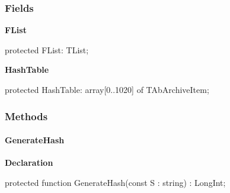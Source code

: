 \documentclass{report}
\newif\ifpdf
\begin{document}
\subsubsection*{\large{\textbf{Fields}}\normalsize\hspace{1ex}\hfill}
\begin{list}{}{
\setlength{\itemindent}{0cm}
\setlength{\listparindent}{0cm}
\setlength{\leftmargin}{\evensidemargin}
\addtolength{\leftmargin}{\tmplength}
\settowidth{\labelsep}{X}
\addtolength{\leftmargin}{\labelsep}
\setlength{\labelwidth}{\tmplength}
}
\label{AbArcTyp.TAbArchiveList-FList}
\item[\textbf{FList}\hfill]
\ifpdf
\begin{flushleft}
\fi
\begin{ttfamily}
protected FList: TList;\end{ttfamily}

\ifpdf
\end{flushleft}
\fi


\par  \label{AbArcTyp.TAbArchiveList-HashTable}
\item[\textbf{HashTable}\hfill]
\ifpdf
\begin{flushleft}
\fi
\begin{ttfamily}
protected HashTable: array[0..1020] of TAbArchiveItem;\end{ttfamily}

\ifpdf
\end{flushleft}
\fi


\par  \end{list}
\subsubsection*{\large{\textbf{Methods}}\normalsize\hspace{1ex}\hfill}
\paragraph*{GenerateHash}\hspace*{\fill}

\label{AbArcTyp.TAbArchiveList-GenerateHash}
\begin{list}{}{
\setlength{\itemindent}{0cm}
\setlength{\listparindent}{0cm}
\setlength{\leftmargin}{\evensidemargin}
\addtolength{\leftmargin}{\tmplength}
\settowidth{\labelsep}{X}
\addtolength{\leftmargin}{\labelsep}
\setlength{\labelwidth}{\tmplength}
}
\item[\textbf{Declaration}\hfill]
\ifpdf
\begin{flushleft}
\fi
\begin{ttfamily}
protected function GenerateHash(const S : string) : LongInt;\end{ttfamily}

\ifpdf
\end{flushleft}
\fi

\end{list}
\end{document}
